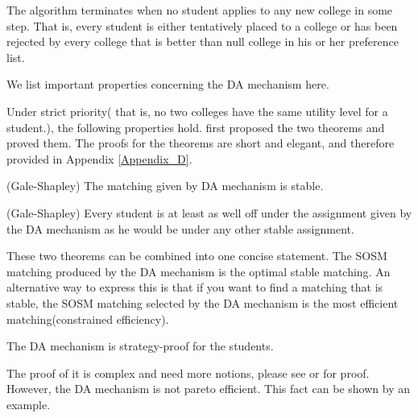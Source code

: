 The algorithm terminates when no student applies to any new college in
some step. That is, every  student is either tentatively placed to a college
or has been rejected by every college that is better than null college
in his or her preference list. 

We list important properties concerning the DA mechanism here.

Under strict priority( that is, no two colleges have  the same utility
level for a student.), the following properties
hold. \parencite{Gale1962} first proposed the two theorems and proved
them. The proofs for the theorems are short and elegant, and therefore
provided in Appendix \ref{Appendix_D}.

\begin{thm*}(Gale-Shapley)
The matching given by DA mechanism is stable.
\end{thm*}

\begin{thm*}(Gale-Shapley)
Every student is at least as well off under the assignment given by
the DA mechanism as he would be under any other stable assignment.
\end{thm*}

These two theorems can be combined into one concise statement. The SOSM
matching produced by the DA mechanism is the optimal stable matching.
An alternative way to express this is that if you want to find a
matching that is stable, the SOSM matching selected by the DA  mechanism is the most
efficient matching(constrained efficiency).

\begin{thm*}
\label{thm1}
The DA mechanism is strategy-proof for the students.
\end{thm*}

The proof of it is complex and need more notions, please see \parencite{Roth1982a} or \parencite{Roth1990}for proof.
However, the DA mechanism is not pareto efficient.  This fact can be shown by an example.

